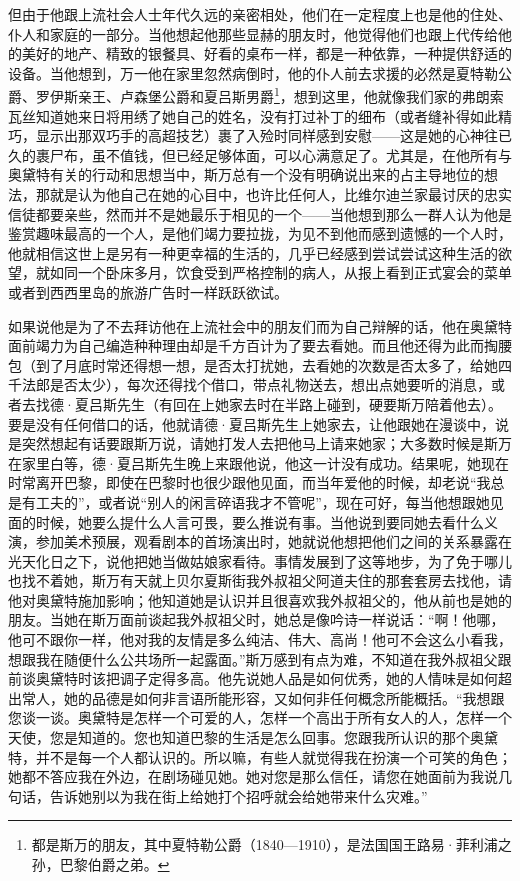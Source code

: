 \par 但由于他跟上流社会人士年代久远的亲密相处，他们在一定程度上也是他的住处、仆人和家庭的一部分。当他想起他那些显赫的朋友时，他觉得他们也跟上代传给他的美好的地产、精致的银餐具、好看的桌布一样，都是一种依靠，一种提供舒适的设备。当他想到，万一他在家里忽然病倒时，他的仆人前去求援的必然是夏特勒公爵、罗伊斯亲王、卢森堡公爵和夏吕斯男爵\footnote{都是斯万的朋友，其中夏特勒公爵（1840—1910），是法国国王路易·菲利浦之孙，巴黎伯爵之弟。}，想到这里，他就像我们家的弗朗索瓦丝知道她来日将用绣了她自己的姓名，没有打过补丁的细布（或者缝补得如此精巧，显示出那双巧手的高超技艺）裹了入殓时同样感到安慰——这是她的心神往已久的裹尸布，虽不值钱，但已经足够体面，可以心满意足了。尤其是，在他所有与奥黛特有关的行动和思想当中，斯万总有一个没有明确说出来的占主导地位的想法，那就是认为他自己在她的心目中，也许比任何人，比维尔迪兰家最讨厌的忠实信徒都要亲些，然而并不是她最乐于相见的一个——当他想到那么一群人认为他是鉴赏趣味最高的一个人，是他们竭力要拉拢，为见不到他而感到遗憾的一个人时，他就相信这世上是另有一种更幸福的生活的，几乎已经感到尝试尝试这种生活的欲望，就如同一个卧床多月，饮食受到严格控制的病人，从报上看到正式宴会的菜单或者到西西里岛的旅游广告时一样跃跃欲试。
\par 如果说他是为了不去拜访他在上流社会中的朋友们而为自己辩解的话，他在奥黛特面前竭力为自己编造种种理由却是千方百计为了要去看她。而且他还得为此而掏腰包（到了月底时常还得想一想，是否太打扰她，去看她的次数是否太多了，给她四千法郎是否太少），每次还得找个借口，带点礼物送去，想出点她要听的消息，或者去找德·夏吕斯先生（有回在上她家去时在半路上碰到，硬要斯万陪着他去）。要是没有任何借口的话，他就请德·夏吕斯先生上她家去，让他跟她在漫谈中，说是突然想起有话要跟斯万说，请她打发人去把他马上请来她家；大多数时候是斯万在家里白等，德·夏吕斯先生晚上来跟他说，他这一计没有成功。结果呢，她现在时常离开巴黎，即使在巴黎时也很少跟他见面，而当年爱他的时候，却老说“我总是有工夫的”，或者说“别人的闲言碎语我才不管呢”，现在可好，每当他想跟她见面的时候，她要么提什么人言可畏，要么推说有事。当他说到要同她去看什么义演，参加美术预展，观看剧本的首场演出时，她就说他想把他们之间的关系暴露在光天化日之下，说他把她当做姑娘家看待。事情发展到了这等地步，为了免于哪儿也找不着她，斯万有天就上贝尔夏斯街我外叔祖父阿道夫住的那套套房去找他，请他对奥黛特施加影响；他知道她是认识并且很喜欢我外叔祖父的，他从前也是她的朋友。当她在斯万面前谈起我外叔祖父时，她总是像吟诗一样说话：“啊！他哪，他可不跟你一样，他对我的友情是多么纯洁、伟大、高尚！他可不会这么小看我，想跟我在随便什么公共场所一起露面。”斯万感到有点为难，不知道在我外叔祖父跟前谈奥黛特时该把调子定得多高。他先说她人品是如何优秀，她的人情味是如何超出常人，她的品德是如何非言语所能形容，又如何非任何概念所能概括。“我想跟您谈一谈。奥黛特是怎样一个可爱的人，怎样一个高出于所有女人的人，怎样一个天使，您是知道的。您也知道巴黎的生活是怎么回事。您跟我所认识的那个奥黛特，并不是每一个人都认识的。所以嘛，有些人就觉得我在扮演一个可笑的角色；她都不答应我在外边，在剧场碰见她。她对您是那么信任，请您在她面前为我说几句话，告诉她别以为我在街上给她打个招呼就会给她带来什么灾难。”
